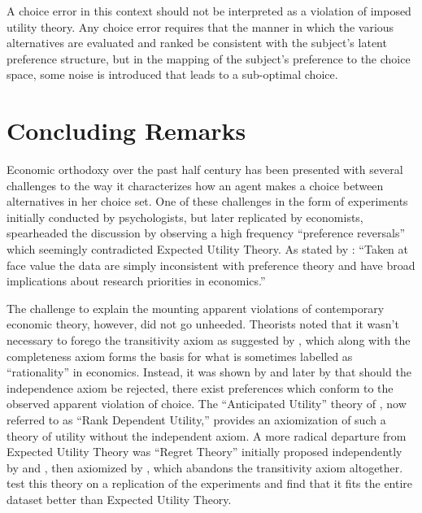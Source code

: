 \documentclass[../main.tex]{subfiles}
\begin{document}
A choice error in this context should not be interpreted as a violation of imposed utility theory.
Any choice error requires that the manner in which the various alternatives are evaluated and ranked be consistent with the subject's latent preference structure, but in the mapping of the subject's preference to the choice space, some noise is introduced that leads to a sub-optimal choice.

\singlespacing
\section{Concluding Remarks}
\doublespacing

Economic orthodoxy over the past half century has been presented with several challenges to the way it characterizes how an agent makes a choice between alternatives in her choice set.
One of these challenges in the form of experiments initially conducted by psychologists, but later replicated by economists, spearheaded the discussion by observing a high frequency \enquote{preference reversals} which seemingly contradicted Expected Utility Theory.
As stated by \textcite{Grether1979}: \enquote{Taken at face value the data are simply inconsistent with preference theory and have broad implications about research priorities in economics.}

The challenge to explain the mounting apparent violations of contemporary economic theory, however, did not go unheeded.
Theorists noted that it wasn't necessary to forego the transitivity axiom as suggested by \textcite[623]{Grether1979}, which along with the completeness axiom forms the basis for what is sometimes labelled as \enquote{rationality} in economics.
Instead, it was shown by \textcite{Holt1986} and later by \textcite{Karni1987} that should the independence axiom be rejected, there exist preferences which conform to the observed apparent violation of choice.
The \enquote{Anticipated Utility} theory of \textcite{Quiggin1982}, now referred to as \enquote{Rank Dependent Utility,} provides an axiomization of such a theory of utility without the independent axiom.
A more radical departure from Expected Utility Theory was \enquote{Regret  Theory} initially proposed independently by \textcite{Bell1982} and \textcite{Loomes1982}, then axiomized by \textcite{Fishburn1987}, which abandons the transitivity axiom altogether.
\textcite{Loomes1989} test this theory on a replication of the \textcite{Grether1979} experiments and find that it fits the entire dataset better than Expected Utility Theory.
\end{document}

